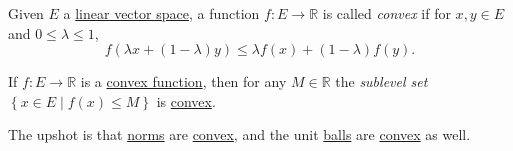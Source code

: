 \begin{definition}\label{def:convex-function}
	Given \(E\) a \hyperref[def:linear-vector-space]{linear vector space}, a function \(f\colon E\to \mathbb{R} \) is called \emph{convex} if for \(x, y\in E\) and \(0 \leq \lambda \leq 1\),
	\[
		f(\lambda x + (1 - \lambda )y) \leq \lambda f(x) + (1 - \lambda )f(y).
	\]
\end{definition}

\begin{remark}
	If \(f\colon E \to \mathbb{R} \) is a \hyperref[def:convex-function]{convex function}, then for any \(M\in \mathbb{R} \) the \emph{sublevel set} \(\left\{ x\in E\mid f(x) \leq M \right\} \) is \hyperref[def:convex-set]{convex}.
\end{remark}

The upshot is that \hyperref[def:norm]{norms} are \hyperref[def:convex-function]{convex}, and the unit \hyperref[def:ball]{balls} are \hyperref[def:convex-set]{convex} as well.

